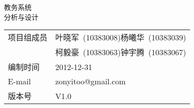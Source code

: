 \begin{titlepage}
  \vspace*{\fill}
  \begin{center}
    \fontsize{50pt}{12pt}
    教务系统\\\vspace{2ex} \fontsize{40pt}{12pt}分析与设计\\\vspace{40ex}
    \Large 
    \begin{tabular}{ll}
      项目组成员 & 叶晓军~(10383008)\quad 杨曦华~(10383039)\\
      & 柯毅豪~(10383063)\quad 钟宇腾~(10383067)\\
      编制时间 & 2012-12-31\\
      E-mail & zonyitoo@gmail.com\\
      版本号 & V1.0
    \end{tabular}
  \end{center}
  \vspace*{\fill}
\end{titlepage}
